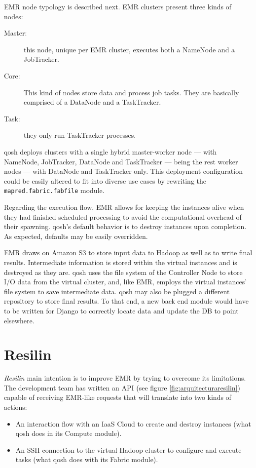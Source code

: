 EMR node typology is described next. EMR clusters present three kinds of nodes:

\begin{description}
    \item[Master:] this node, unique per EMR cluster, executes both a NameNode and a JobTracker.
    \item[Core:] This kind of nodes store data and process job tasks. They are basically comprised of a DataNode and a TaskTracker.
    \item[Task:] they only run TaskTracker processes.
\end{description}

qosh deploys clusters with a single hybrid master-worker node --- with NameNode, JobTracker, DataNode and TaskTracker --- being the rest worker nodes --- with DataNode and TaskTracker only. This deployment configuration could be easily altered to fit into diverse use cases by rewriting the \texttt{mapred.fabric.fabfile} module.

Regarding the execution flow, EMR allows for keeping the instances alive when they had finished scheduled processing to avoid the computational overhead of their spawning. qosh's default behavior is to destroy instances upon completion. As expected, defaults may be easily overridden.

EMR draws on Amazon S3 to store input data to Hadoop as well as to write final results. Intermediate information is stored within the virtual instances and is destroyed as they are. qosh uses the file system of the Controller Node to store I/O data from the virtual cluster, and, like EMR, employs the virtual instances' file system to save intermediate data. qosh may also be plugged a different repository to store final results. To that end, a new back end module would have to be written for Django to correctly locate data and update the DB to point elsewhere.

\section{Resilin}\label{sec:resilin}
\noindent \emph{Resilin} \cite{resilin} main intention is to improve EMR by trying to overcome its limitations. The development team has written an API (see figure \ref{fig:arquitecturaresilin}) capable of receiving EMR-like requests that will translate into two kinds of actions:

\begin{itemize}
    \item An interaction flow with an IaaS Cloud to create and destroy instances (what qosh does in its Compute module).
    \item An SSH connection to the virtual Hadoop cluster to configure and execute tasks (what qosh does with its Fabric module).
\end{itemize}

